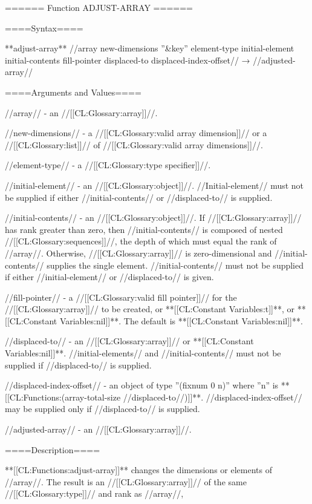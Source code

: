====== Function ADJUST-ARRAY ======

====Syntax====

**adjust-array** //array new-dimensions ''&key'' element-type initial-element initial-contents fill-pointer displaced-to displaced-index-offset// → //adjusted-array//

====Arguments and Values====

//array// - an //[[CL:Glossary:array]]//.

//new-dimensions// - a //[[CL:Glossary:valid array dimension]]// or a //[[CL:Glossary:list]]// of //[[CL:Glossary:valid array dimensions]]//.

//element-type// - a //[[CL:Glossary:type specifier]]//.

//initial-element// - an //[[CL:Glossary:object]]//. //Initial-element// must not be supplied if either //initial-contents// or //displaced-to// is supplied.

//initial-contents// - an //[[CL:Glossary:object]]//. If //[[CL:Glossary:array]]// has rank greater than zero, then //initial-contents// is composed of nested //[[CL:Glossary:sequences]]//, the depth of which must equal the rank of //array//. Otherwise, //[[CL:Glossary:array]]// is zero-dimensional and //initial-contents// supplies the single element. //initial-contents// must not be supplied if either //initial-element// or //displaced-to// is given.

//fill-pointer// - a //[[CL:Glossary:valid fill pointer]]// for the //[[CL:Glossary:array]]// to be created, or **[[CL:Constant Variables:t]]**, or **[[CL:Constant Variables:nil]]**. The default is **[[CL:Constant Variables:nil]]**.

//displaced-to// - an //[[CL:Glossary:array]]// or **[[CL:Constant Variables:nil]]**. //initial-elements// and //initial-contents// must not be supplied if //displaced-to// is supplied.

//displaced-index-offset// - an object of type ''(fixnum 0 n)'' where ''n'' is **[[CL:Functions:(array-total-size //displaced-to//)]]**. //displaced-index-offset// may be supplied only if //displaced-to// is supplied.

//adjusted-array// - an //[[CL:Glossary:array]]//.

====Description====

**[[CL:Functions:adjust-array]]** changes the dimensions or elements of //array//. The result is an //[[CL:Glossary:array]]// of the same //[[CL:Glossary:type]]// and rank as //array//,

